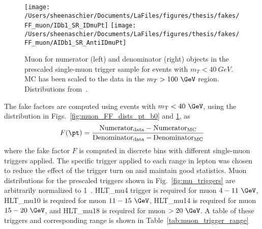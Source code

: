 \documentclass[11pt, oneside]{article}   	%
\begin{document}
\begin{figure}[tbp]
  \centering
  \texttt{[image: /Users/sheenaschier/Documents/LaFiles/figures/thesis/fakes/FF\_muon/IDb1\_SR\_IDmuPt]}
  \texttt{[image: /Users/sheenaschier/Documents/LaFiles/figures/thesis/fakes/FF\_muon/AIDb1\_SR\_AntiIDmuPt]}
  \caption{Muon \pt{} for numerator (left) and denominator (right) objects in the prescaled single-muon trigger sample for events with $m_{T}< 40~ GeV$.  MC has been scaled to the data in the $m_{T} > 100~\GeV$ region. Distributions from~\cite{Boerner:2231917}.}
  \label{fig:muon_FF_dists_pt_b1}
\end{figure}


The fake factors are computed using events with $m_{\mathrm{T}}<40~\GeV$, using the distribution in Figs.~\ref{fig:muon_FF_dists_pt_b0} and \ref{fig:muon_FF_dists_pt_b1}, as
\begin{equation}
  F(\pt) = \frac{\mathrm{Numerator}_{\mathrm{data}} - \mathrm{Numerator}_{\mathrm{MC}}}{\mathrm{Denominator}_{\mathrm{data}} - \mathrm{Denominator}_{\mathrm{MC}}}
\end{equation}
where the fake factor $F$ is computed in discrete \pt{} bins with different single-muon triggers applied. The specific trigger applied to each range in lepton \pt{} was chosen to reduce the effect of the trigger turn on and maintain good statistics. Muon \pt{} distributions for the prescaled triggers shown in Fig.~\ref{fig:mu_triggers} are arbitrarily normalized to 1~\ipb.  HLT\_mu4 trigger is required for muon \pt{} $4 - 11~ \GeV$, HLT\_mu10 is required for muon \pt{} $11- 15~\GeV$, HLT\_mu14 is required for muon \pt{} $15-20~\GeV$, and HLT\_mu18 is required for muon \pt{} $>20~\GeV$. A table of these triggers and corresponding \pt{} range is shown in Table~\ref{tab:muon_trigger_range}  %
\end{document}
